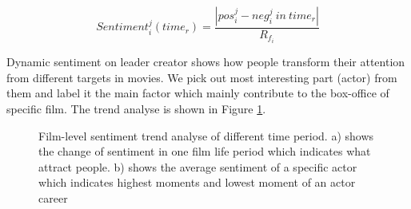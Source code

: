 \begin{equation}
    Sentiment^j_i (time_r) = \frac{|pos^j_i-neg^j_i \ in \ time_r|}{R_{f_i}}
\end{equation}

\par Dynamic sentiment on leader creator shows how people transform their attention from different targets in movies. We pick out most interesting part (actor) from them and label it the main factor which mainly contribute to the box-office of specific film. The trend analyse is shown in Figure \ref{fig:sentiment}.

\begin{figure}[!htbp]
\centering
{}
\hfill
{}
\caption{Film-level sentiment trend analyse of different time period. a) shows the change of sentiment in one film life period which indicates what attract people. b) shows the average sentiment of a specific actor which indicates highest moments and lowest moment of an actor career }
\label{fig:sentiment}
\end{figure}


